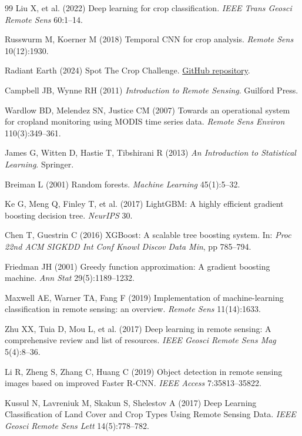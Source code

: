 \documentclass[pdflatex,sn-mathphys]{sn-jnl} %
\begin{document}
\begin{thebibliography}{99}
Liu X, et al. (2022) Deep learning for crop classification. \textit{IEEE Trans Geosci Remote Sens} 60:1--14.

Russwurm M, Koerner M (2018) Temporal CNN for crop analysis. \textit{Remote Sens} 10(12):1930.

Radiant Earth (2024) Spot The Crop Challenge. \href{https://github.com/radiantearth/spot-the-crop-challenge}{GitHub repository}.

Campbell JB, Wynne RH (2011) \textit{Introduction to Remote Sensing}. Guilford Press.
 
Wardlow BD, Melendez SN, Justice CM (2007) Towards an operational system for cropland monitoring using MODIS time series data. \textit{Remote Sens Environ} 110(3):349--361.

James G, Witten D, Hastie T, Tibshirani R (2013) \textit{An Introduction to Statistical Learning}. Springer.

Breiman L (2001) Random forests. \textit{Machine Learning} 45(1):5--32.


Ke G, Meng Q, Finley T, et al. (2017) LightGBM: A highly efficient gradient boosting decision tree. \textit{NeurIPS} 30.

Chen T, Guestrin C (2016) XGBoost: A scalable tree boosting system. In: \textit{Proc 22nd ACM SIGKDD Int Conf Knowl Discov Data Min}, pp 785--794.

Friedman JH (2001) Greedy function approximation: A gradient boosting machine. \textit{Ann Stat} 29(5):1189--1232.

Maxwell AE, Warner TA, Fang F (2019) Implementation of machine-learning classification in remote sensing: an overview. \textit{Remote Sens} 11(14):1633.

Zhu XX, Tuia D, Mou L, et al. (2017) Deep learning in remote sensing: A comprehensive review and list of resources. \textit{IEEE Geosci Remote Sens Mag} 5(4):8--36.

Li R, Zheng S, Zhang C, Huang C (2019) Object detection in remote sensing images based on improved Faster R-CNN. \textit{IEEE Access} 7:35813--35822.


Kussul N, Lavreniuk M, Skakun S, Shelestov A (2017) Deep Learning Classification of Land Cover and Crop Types Using Remote Sensing Data. \textit{IEEE Geosci Remote Sens Lett} 14(5):778--782.


\end{thebibliography}
\end{document}
